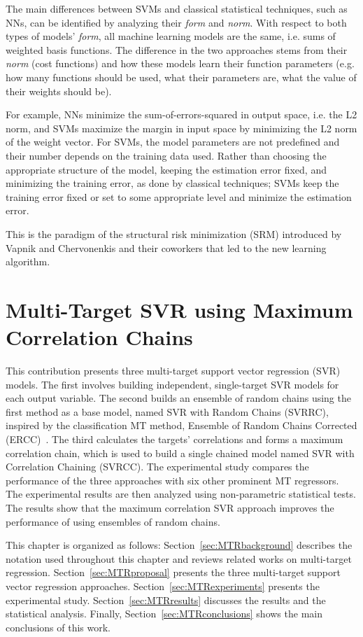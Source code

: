 \documentclass[reqno]{vcuthesis}
\numberwithin{equation}{chapter}
\begin{document}
The main differences between SVMs and classical statistical techniques, such as NNs, can be identified by analyzing their \textit{form} and \textit{norm}. With respect to both types of models' \textit{form}, all machine learning models are the same, i.e. sums of weighted basis functions. The difference in the two approaches stems from their \textit{norm} (cost functions) and how these models learn their function parameters (e.g. how many functions should be used, what their parameters are, what the value of their weights should be). 

For example, NNs minimize the sum-of-errors-squared in output space, i.e. the L2 norm, and SVMs maximize the margin in input space by minimizing the L2 norm of the weight vector. For SVMs, the model parameters are not predefined and their number depends on the training data used. Rather than choosing the appropriate structure of the model, keeping the estimation error fixed, and minimizing the training error, as done by classical techniques; SVMs keep the training error fixed or set to some appropriate level and minimize the estimation error. 

This is the paradigm of the structural risk minimization (SRM) introduced by Vapnik and Chervonenkis and their coworkers that led to the new learning algorithm.


\chapter{Multi-Target SVR using Maximum Correlation Chains}
This contribution presents three multi-target support vector regression (SVR) models. The first involves building independent, single-target SVR models for each output variable. The second builds an ensemble of random chains using the first method as a base model, named SVR with Random Chains (SVRRC), inspired by the classification MT method, Ensemble of Random Chains Corrected (ERCC)~\cite{Spyromitros2014}. The third calculates the targets' correlations and forms a maximum correlation chain, which is used to build a single chained model named SVR with Correlation Chaining (SVRCC). The experimental study compares the performance of the three approaches with six other prominent MT regressors. The experimental results are then analyzed using non-parametric statistical tests. The results show that the maximum correlation SVR approach improves the performance of using ensembles of random chains. 

This chapter is organized as follows: Section~\ref{sec:MTRbackground} describes the notation used throughout this chapter and reviews related works on multi-target regression. Section~\ref{sec:MTRproposal} presents the three multi-target support vector regression approaches. Section~\ref{sec:MTRexperiments} presents the experimental study. Section~\ref{sec:MTRresults} discusses the results and the statistical analysis. Finally, Section~\ref{sec:MTRconclusions} shows the main conclusions of this work.
\end{document}
